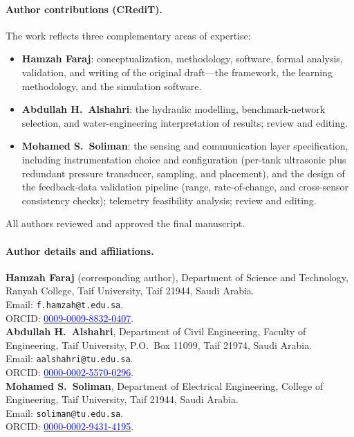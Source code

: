 \documentclass[11pt,a4paper]{article}
\begin{document}
\paragraph{Author contributions (CRediT).}
The work reflects three complementary areas of expertise:
\begin{itemize}
\item \textbf{Hamzah Faraj}: conceptualization, methodology, software, formal
analysis, validation, and writing of the original draft---the framework, the
learning methodology, and the simulation software.
\item \textbf{Abdullah H.\ Alshahri}: the hydraulic modelling, benchmark-network
selection, and water-engineering interpretation of results; review and editing.
\item \textbf{Mohamed S.\ Soliman}: the sensing and communication layer
specification, including instrumentation choice and configuration (per-tank
ultrasonic plus redundant pressure transducer, sampling, and placement), and the
design of the feedback-data validation pipeline (range, rate-of-change, and
cross-sensor consistency checks); telemetry feasibility analysis; review and
editing.
\end{itemize}
All authors reviewed and approved the final manuscript.

\paragraph{Author details and affiliations.}
\textbf{Hamzah Faraj} (corresponding author), Department of Science and
Technology, Ranyah College, Taif University, Taif 21944, Saudi Arabia.\\
Email: \texttt{f.hamzah@t.edu.sa}.\\ ORCID:
\href{https://orcid.org/0009-0009-8832-0407}{\textcolor{blue}{0009-0009-8832-0407}}.
\\[2pt]
\textbf{Abdullah H.\ Alshahri}, Department of Civil Engineering, Faculty of
Engineering, Taif University, P.O.\ Box 11099, Taif 21974, Saudi Arabia.\\
Email: \texttt{aalshahri@tu.edu.sa}.\\ ORCID:
\href{https://orcid.org/0000-0002-5570-0296}{\textcolor{blue}{0000-0002-5570-0296}}.
\\[2pt]
\textbf{Mohamed S.\ Soliman}, Department of Electrical Engineering, College of
Engineering, Taif University, Taif 21944, Saudi Arabia.\\
Email: \texttt{soliman@tu.edu.sa}.\\ ORCID:
\href{https://orcid.org/0000-0002-9431-4195}{\textcolor{blue}{0000-0002-9431-4195}}.
\end{document}
